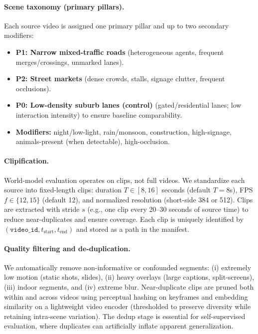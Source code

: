 \paragraph{Scene taxonomy (primary pillars).}
Each source video is assigned one primary pillar and up to two secondary modifiers:
\begin{itemize}[leftmargin=*,itemsep=2pt]
  \item \textbf{P1: Narrow mixed-traffic roads} (heterogeneous agents, frequent merges/crossings, unmarked lanes).
  \item \textbf{P2: Street markets} (dense crowds, stalls, signage clutter, frequent occlusions).
  \item \textbf{P0: Low-density suburb lanes (control)} (gated/residential lanes; low interaction intensity) to ensure baseline comparability.
  \item \textbf{Modifiers:} night/low-light, rain/monsoon, construction, high-signage, animals-present (when detectable), high-occlusion.
\end{itemize}

\paragraph{Clipification.}
World-model evaluation operates on clips, not full videos. We standardize each source into fixed-length clips: duration $T\in[8,16]$ seconds (default $T=8$s), FPS $f\in\{12,15\}$ (default 12), and normalized resolution (short-side 384 or 512). Clips are extracted with stride $s$ (e.g., one clip every 20--30 seconds of source time) to reduce near-duplicates and ensure coverage. Each clip is uniquely identified by $(\texttt{video\_id}, t_{\mathrm{start}}, t_{\mathrm{end}})$ and stored as a path in the manifest.

\paragraph{Quality filtering and de-duplication.}
We automatically remove non-informative or confounded segments: (i) extremely low motion (static shots, slides), (ii) heavy overlays (large captions, split-screens), (iii) indoor segments, and (iv) extreme blur. Near-duplicate clips are pruned both within and across videos using perceptual hashing on keyframes and embedding similarity on a lightweight video encoder (thresholded to preserve diversity while retaining intra-scene variation). The dedup stage is essential for self-supervised evaluation, where duplicates can artificially inflate apparent generalization.


